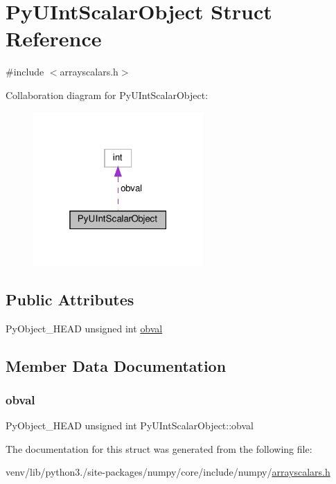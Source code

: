 \hypertarget{structPyUIntScalarObject}{}\section{Py\+U\+Int\+Scalar\+Object Struct Reference}
\label{structPyUIntScalarObject}


{\ttfamily \#include $<$arrayscalars.\+h$>$}



Collaboration diagram for Py\+U\+Int\+Scalar\+Object\+:
\nopagebreak
\begin{figure}[H]
\begin{center}
\leavevmode
\includegraphics[width=184pt]{structPyUIntScalarObject__coll__graph}
\end{center}
\end{figure}
\subsection*{Public Attributes}
\begin{DoxyCompactItemize}
\item 
Py\+Object\+\_\+\+H\+E\+AD unsigned int \hyperlink{structPyUIntScalarObject_a42442bf5cb2f6345805d698865242ecc}{obval}
\end{DoxyCompactItemize}


\subsection{Member Data Documentation}
\mbox{\label{structPyUIntScalarObject_a42442bf5cb2f6345805d698865242ecc}} 
\subsubsection{\texorpdfstring{obval}{obval}}
{\footnotesize\ttfamily Py\+Object\+\_\+\+H\+E\+AD unsigned int Py\+U\+Int\+Scalar\+Object\+::obval}



The documentation for this struct was generated from the following file\+:\begin{DoxyCompactItemize}
\item 
venv/lib/python3./site-\/packages/numpy/core/include/numpy/\hyperlink{arrayscalars_8h}{arrayscalars.\+h}\end{DoxyCompactItemize}
